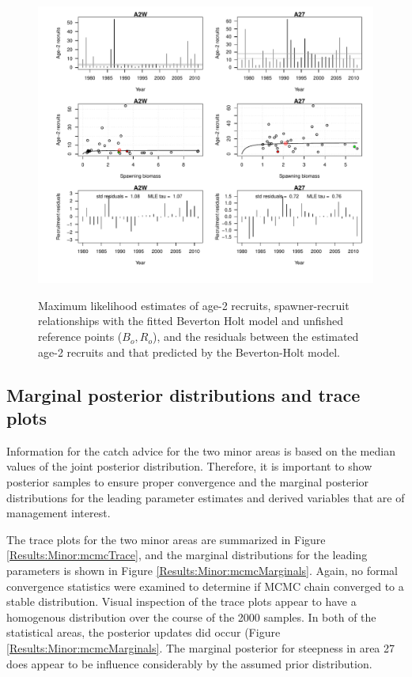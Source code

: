 \begin{figure}[!tbp]
	\includegraphics[width=\textwidth]{../FIGS/MinorAreas/iscam_fig_Recruitment.pdf}\\
	\caption{Maximum likelihood estimates of age-2 recruits, spawner-recruit relationships with the fitted Beverton Holt model and unfished reference points ($B_o, R_o$), and the residuals between the estimated age-2 recruits and that predicted by the Beverton-Holt model.}\label{Results:Minor:Recruitment}
\end{figure}


\subsection{Marginal posterior distributions and trace plots}

Information for the catch advice for the two minor areas is based on the median values of the joint posterior distribution.  Therefore, it is important to show posterior samples to ensure proper convergence and the marginal posterior distributions for the leading parameter estimates and derived variables  that are of management interest.

 The trace plots for the two minor areas are summarized in Figure \ref{Results:Minor:mcmcTrace}, and the marginal distributions for the leading parameters is shown in Figure \ref{Results:Minor:mcmcMarginals}.  Again, no formal convergence statistics were examined to determine if MCMC chain converged to a stable distribution.  Visual inspection of the trace plots appear to have a homogenous distribution over the course of the 2000 samples.  In both of the statistical areas, the posterior updates did occur (Figure \ref{Results:Minor:mcmcMarginals}.  The marginal posterior for steepness in area 27 does appear to be influence considerably by the assumed prior distribution.
 
